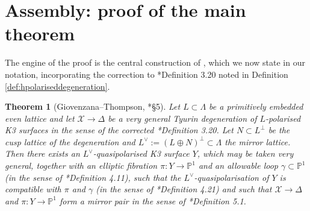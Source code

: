 \documentclass[11pt]{amsart}
\theoremstyle{plain}
\newtheorem{theorem}{Theorem}[section]
\theoremstyle{definition}
\newcommand{\Pn}{\mathbb{P}^1}
\newcommand{\Lam}{\Lambda}
\newcommand{\cX}{\mathcal{X}}
\begin{document}
\section{Assembly: proof of the main theorem}\label{sec:proof}

The engine of the proof is the central construction of
\cite{dfk3slpms}, which we now state in our notation, incorporating the
correction to \cite{dfk3slpms}*{Definition 3.20} noted in
Definition \ref{def:hpolariseddegeneration}.

\begin{theorem}[{Giovenzana--Thompson, \cite{dfk3slpms}*{\S 5}}]\label{thm:GT}
Let $L\subset\Lam$ be a primitively embedded even lattice and let
$\cX\to\Delta$ be a very general Tyurin degeneration of $L$-polarised K3
surfaces in the sense of the corrected \cite{dfk3slpms}*{Definition 3.20}. Let
$N\subset L^\perp$ be the cusp lattice of the degeneration and
$L^\vee:=(L\oplus N)^\perp\subset\Lam$ the mirror lattice. Then there exists an
$L^\vee$-quasipolarised K3 surface $Y$, which may be taken very general,
together with an elliptic fibration $\pi\colon Y\to\Pn$ and an allowable loop
$\gamma\subset\Pn$ (in the sense of \cite{dfk3slpms}*{Definition 4.11}), such
that the $L^\vee$-quasipolarisation of $Y$ is compatible with $\pi$ and
$\gamma$ (in the sense of \cite{dfk3slpms}*{Definition 4.21}) and such that
$\cX\to\Delta$ and $\pi\colon Y\to\Pn$ form a mirror pair in the sense of
\cite{dfk3slpms}*{Definition 5.1}.
\end{theorem}
\end{document}
